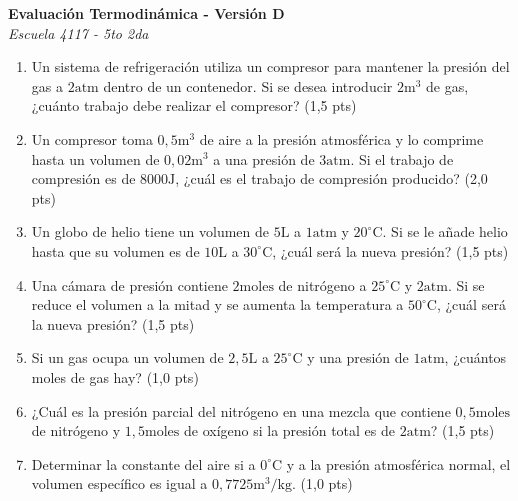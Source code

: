 \documentclass[a4paper,10pt]{article}
\newenvironment{versionexamen}[1]{
  \begin{minipage}[t]{0.48\textwidth}
    \textbf{Evaluación Termodinámica - Versión #1} \\
    \textit{Escuela 4117 - 5to 2da}
    \begin{enumerate}[label=\textbf{\arabic*.}, leftmargin=15pt, topsep=4pt, itemsep=4pt]
      \small
}{
    \end{enumerate}
    \vspace{0.4cm}
  \end{minipage}
}
\begin{document}
\begin{versionexamen}{D}
	\item Un sistema de refrigeración utiliza un compresor para mantener la presión del gas a $2\text{atm}$ dentro de un contenedor. Si se desea introducir $2\text{m}^3$ de gas, ¿cuánto trabajo debe realizar el compresor? (1,5 pts)
	\item Un compresor toma $0,5\text{m}^3$ de aire a la presión atmosférica y lo comprime hasta un volumen de $0,02\text{m}^3$ a una presión de $3\text{atm}$. Si el trabajo de compresión es de $8000\text{J}$, ¿cuál es el trabajo de compresión producido? (2,0 pts)
	\item Un globo de helio tiene un volumen de $5\text{L}$ a $1\text{atm}$ y $20^\circ$C. Si se le añade helio hasta que su volumen es de $10\text{L}$ a $30^\circ$C, ¿cuál será la nueva presión? (1,5 pts)
	\item Una cámara de presión contiene $2\text{moles}$ de nitrógeno a $25^\circ$C y $2\text{atm}$. Si se reduce el volumen a la mitad y se aumenta la temperatura a $50^\circ$C, ¿cuál será la nueva presión? (1,5 pts)
	\item Si un gas ocupa un volumen de $2,5\text{L}$ a $25^\circ$C y una presión de $1\text{atm}$, ¿cuántos moles de gas hay? (1,0 pts)
	\item ¿Cuál es la presión parcial del nitrógeno en una mezcla que contiene $0,5\text{moles}$ de nitrógeno y $1,5\text{moles}$ de oxígeno si la presión total es de $2\text{atm}$? (1,5 pts)
	\item Determinar la constante del aire si a $0^\circ$C y a la presión atmosférica normal, el volumen específico es igual a $0,7725 \text{m}^3/\text{kg}$. (1,0 pts)
\end{versionexamen}
\end{document}
